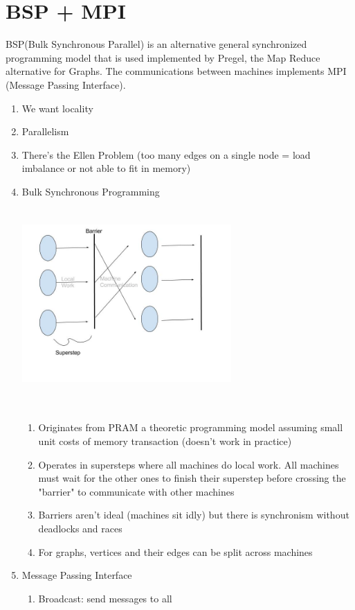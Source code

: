 \documentclass[twoside]{article}
\begin{document}
\section{BSP + MPI}
BSP(Bulk Synchronous Parallel) is an alternative general synchronized programming model that is used implemented by Pregel, the Map Reduce alternative for Graphs. The communications between machines implements MPI (Message Passing Interface).
\begin{enumerate}
\item We want locality
\item Parallelism
\item There's the Ellen Problem (too many edges on a single node = load imbalance or not able to fit in memory)
\item Bulk Synchronous Programming
\includegraphics[width=8cm, height=8cm]{590SBSPdiagram.jpg}
\begin{enumerate}
\item Originates from PRAM a theoretic programming model assuming small unit costs of memory transaction (doesn't work in practice)
\item Operates in supersteps where all machines do local work. All machines must wait for the other ones to finish their superstep before crossing the "barrier" to communicate with other machines
\item Barriers aren't ideal (machines sit idly) but there is synchronism without deadlocks and races
\item For graphs, vertices and their edges can be split across machines
\end{enumerate}
\item Message Passing Interface
\begin{enumerate}
\item Broadcast: send messages to all

\end{enumerate}
\end{enumerate}
\end{document}

